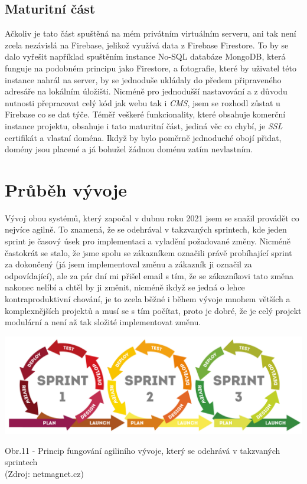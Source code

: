 \documentclass[12pt,a4paper]{report}
\begin{document}
  \section{Maturitní část}
  Ačkoliv je tato část spuštěná na mém privátním virtuálním serveru, ani tak není zcela
  nezávislá na Firebase, jelikož využívá data z Firebase Firestore. To by se dalo vyřešit
  například spuštěním instance No-SQL databáze MongoDB, která funguje na podobném principu jako 
  Firestore, a fotografie, které by uživatel této instance nahrál na server, by se jednoduše ukládaly
  do předem připraveného adresáře na lokálním úložišti. Nicméně pro jednodušší nastavování a z důvodu nutnosti
  přepracovat celý kód jak webu tak i \emph{CMS}, jsem se rozhodl zůstat u Firebase co se dat týče. 
  Téměř veškeré funkcionality, které obsahuje komerční instance projektu, obsahuje i tato maturitní část, 
  jediná věc co chybí, je \emph{SSL} certifikát a vlastní doména. Ikdyž by bylo poměrně jednoduché obojí přidat,
  domény jsou placené a já bohužel žádnou doménu zatím nevlastním.
 
  \chapter{Průběh vývoje}
  Vývoj obou systémů, který započal v dubnu roku 2021 jsem se snažil provádět co nejvíce agilně. To znamená,
  že se odehrával v takzvaných sprintech, kde jeden sprint je časový úsek pro implementaci a vyladění požadované změny.
  Nicméně častokrát se stalo, že jsme spolu se zákazníkem označili právě probíhající sprint za dokončený (já jsem implementoval změnu a zákazník ji označil za odpovídající), ale za pár dní mi 
  přišel email s tím, že se zákazníkovi tato změna nakonec nelíbí a chtěl by ji změnit, nicméně ikdyž se jedná o lehce kontraproduktivní chování, 
  je to zcela běžné i během vývoje mnohem větších a komplexnějších projektů a musí se s tím počítat, proto je dobré, že je celý projekt modulární a není až tak složité implementovat změnu.
  
  \vspace*{0.5cm}
  \noindent\includegraphics[width=\linewidth]{agile.png}
  \begin{center}
    Obr.11 -  Princip fungování agiliního vývoje, který se odehrává v takzvaných sprintech \\
    (Zdroj: netmagnet.cz)
  \end{center}
  \vspace*{0.5cm}
 
\end{document}
